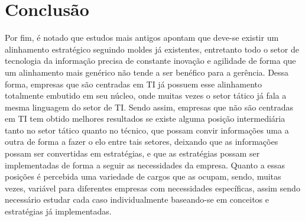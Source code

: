 \documentclass[review]{elsarticle}
\begin{document}
\section{Conclusão}
Por fim, é notado que estudos mais antigos apontam que deve-se existir um alinhamento estratégico seguindo moldes já existentes, entretanto todo o setor de tecnologia da informação precisa de constante inovação e agilidade de forma que um alinhamento mais genérico não tende a ser benéfico para a gerência. Dessa forma, empresas que são centradas em TI já possuem esse alinhamento totalmente embutido em seu núcleo, onde muitas vezes o setor tático já fala a mesma linguagem do setor de TI. Sendo assim, empresas que não são centradas em TI tem obtido melhores resultados se existe alguma posição intermediária tanto no setor tático quanto no técnico, que possam convir informações uma a outra de forma a fazer o elo entre tais setores, deixando que as informações possam ser convertidas em estratégias, e que as estratégias possam ser implementadas de forma a seguir as necessidades da empresa.
Quanto a essas posições é percebida uma variedade de cargos que as ocupam, sendo, muitas vezes, variável para diferentes empresas com necessidades específicas, assim sendo necessário estudar cada caso individualmente baseando-se em conceitos e estratégias já implementadas.



\end{document}
